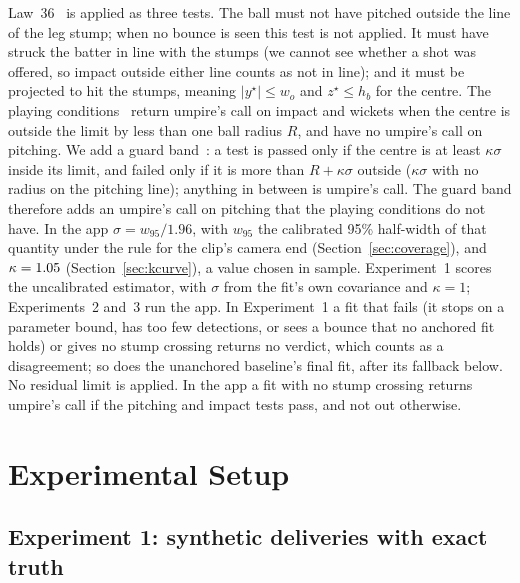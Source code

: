 \documentclass[journal]{IEEEtran}
\begin{document}
Law~36~\cite{mcc2017laws} is applied as three tests. The ball must not have pitched outside the line of the
leg stump; when no bounce is seen this test is not applied. It must have struck the batter in line with the
stumps (we cannot see whether a shot was offered, so impact outside either line counts as not in line); and
it must be projected to hit the stumps, meaning $|y^\star| \leq w_o$ and $z^\star \leq h_b$ for the centre.
The playing conditions~\cite{icc2023drs} return umpire's call on impact and wickets when the centre is
outside the limit by less than one ball radius $R$, and have no umpire's call on pitching. We add a guard
band~\cite{jcgm106,carullo2024conformity}: a test is passed only if the centre is at least $\kappa\sigma$
inside its limit, and failed only if it is more than $R + \kappa\sigma$ outside ($\kappa\sigma$ with no
radius on the pitching line); anything in between is umpire's call. The guard band therefore adds an
umpire's call on pitching that the playing conditions do not have. In the app $\sigma = w_{95}/1.96$, with
$w_{95}$ the calibrated 95\% half-width of that quantity under the rule for the clip's camera end
(Section~\ref{sec:coverage}), and $\kappa = 1.05$ (Section~\ref{sec:kcurve}), a value chosen in
sample. Experiment~1 scores the uncalibrated estimator, with $\sigma$ from the fit's own covariance and
$\kappa = 1$; Experiments~2 and~3 run the app. In Experiment~1 a fit that fails (it stops on a parameter
bound, has too few detections, or sees a bounce that no anchored fit holds) or gives no stump crossing
returns no verdict, which counts as a disagreement; so does the unanchored baseline's
final fit, after its fallback below. No residual limit is applied. In the app a fit with no stump
crossing returns umpire's call if the pitching and impact tests pass, and not out otherwise.

\section{Experimental Setup}
\label{sec:setup}

\subsection{Experiment 1: synthetic deliveries with exact truth}
\end{document}

